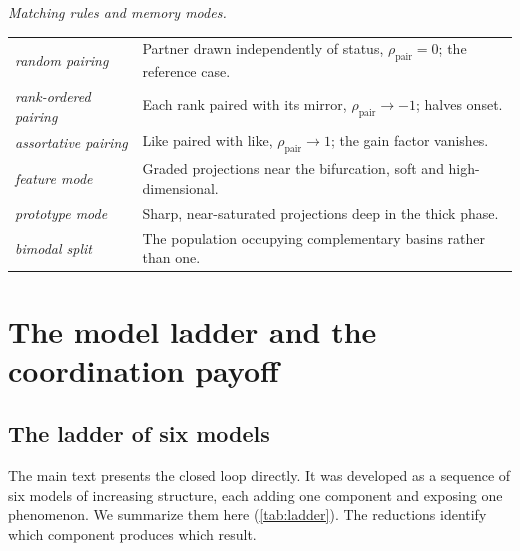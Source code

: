 \documentclass[
  aps,prx,
  preprint,
  superscriptaddress,
  nofootinbib
]{revtex4-2}
\newcommand{\rhopair}{\rho_{\mathrm{pair}}}
\begin{document}
{\smallskip\noindent\textit{Matching rules and memory modes.}\\[3pt]
\begin{tabular}{@{}l@{\hspace{1.6em}}l@{}}
\toprule
\emph{random pairing} & Partner drawn independently of status, $\rhopair=0$; the reference case. \\
\emph{rank-ordered pairing} & Each rank paired with its mirror, $\rhopair\to-1$; halves onset. \\
\emph{assortative pairing} & Like paired with like, $\rhopair\to1$; the gain factor vanishes. \\
\emph{feature mode} & Graded projections near the bifurcation, soft and high-dimensional. \\
\emph{prototype mode} & Sharp, near-saturated projections deep in the thick phase. \\
\emph{bimodal split} & The population occupying complementary basins rather than one. \\
\bottomrule
\end{tabular}

}

\bigskip

\section{The model ladder and the coordination payoff}\label{sm:ladder}

\subsection{The ladder of six models}

\noindent The main text presents the closed loop directly. It was developed as a sequence of six models of increasing structure, each adding one component and exposing one phenomenon. We summarize them here (\cref{tab:ladder}). The reductions identify which component produces which result.
\end{document}
